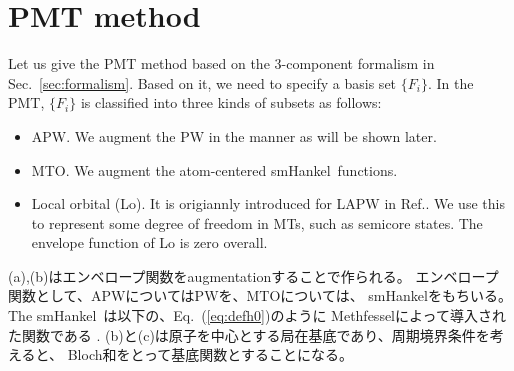 \documentclass[a4paper,10pt,aip,onecolumn,amsmath,amssymb,floatfix,rmp]{revtex4-1}
\newcommand{\bfR}{{\bf R}}
\newcommand{\req}[1]{\mbox{Eq.~\!(\ref{#1})}}
\newcommand{\refsec}[1]{\mbox{Sec.~\!\ref{#1}}}
\def\smh{smHankel}
\begin{document}
\section{PMT method}
\label{sec:pmtmethod} Let us give the PMT method based on the
3-component formalism in \refsec{sec:formalism}. Based on it, we need to
specify a basis set $\{F_i\}$.  In the PMT, $\{F_i\}$ is classified into
three kinds of subsets as follows:
\begin{itemize}
\item[(a)] APW. We augment the PW in the manner as will be shown later.

\item[(b)] MTO. We augment the atom-centered \smh\ functions. 

\item[(c)] Local orbital (Lo). It is origiannly introduced for LAPW in Ref..
   We use this to represent some degree of freedom in MTs,
   such as semicore states. The envelope function of Lo is zero overall.

\end{itemize}

(a),(b)はエンベロープ関数をaugmentationすることで作られる。
エンベロープ関数として、APWについてはPWを、MTOについては、
\smh をもちいる。The \smh \ は以下の、\req{eq:defh0}のように
Methfesselによって導入された関数である \cite{lmfchap,Bott98}.
(b)と(c)は原子を中心とする局在基底であり、周期境界条件を考えると、
Bloch和をとって基底関数とすることになる。
\end{document}
